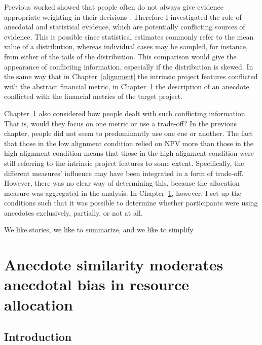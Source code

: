 \documentclass[a4paper, nobind, dvipsnames]{templates/ociamthesis}
\theoremstyle{definition}
\theoremstyle{definition}
\theoremstyle{definition}
\theoremstyle{definition}
\theoremstyle{remark}
\begin{document}
Previous worked showed that people often do not always give evidence appropriate
weighting in their decisions \autocite{griffin1992}. Therefore I investigated the role
of anecdotal and statistical evidence, which are potentially conflicting sources
of evidence. This is possible since statistical estimates commonly refer to the
mean value of a distribution, whereas individual cases may be sampled, for
instance, from either of the tails of the distribution. This comparison would
give the appearance of conflicting information, especially if the distribution
is skewed. In the same way that in Chapter~\ref{alignment} the intrinsic
project features conflicted with the abstract financial metric, in
Chapter~\ref{anecdotes} the description of an anecdote conflicted with the
financial metrics of the target project.

Chapter~\ref{anecdotes} also considered how people dealt with such conflicting
information. That is, would they focus on one metric or use a trade-off? In the
previous chapter, people did not seem to predominantly use one cue or another.
The fact that those in the low alignment condition relied on NPV more than those
in the high alignment condition means that those in the high alignment condition
were still referring to the intrinsic project features to some extent.
Specifically, the different measures' influence may have been integrated in a
form of trade-off. However, there was no clear way of determining this, because
the allocation measure was aggregated in the analysis. In
Chapter~\ref{anecdotes}, however, I set up the conditions such that it was
possible to determine whether participants were using anecdotes exclusively,
partially, or not at all.



\begin{savequote}
We like stories, we like to summarize, and we like to simplify
\end{savequote}

\hypertarget{anecdotes}{%
\chapter{Anecdote similarity moderates anecdotal bias in resource allocation}\label{anecdotes}}

\minitoc

\section{Introduction}
\end{document}

